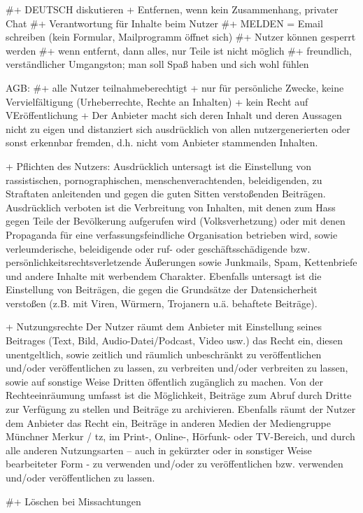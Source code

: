 #+ DEUTSCH diskutieren
+ Entfernen, wenn kein Zusammenhang, privater Chat
#+ Verantwortung für Inhalte beim Nutzer
#+ MELDEN = Email schreiben (kein Formular, Mailprogramm öffnet sich)
#+ Nutzer können gesperrt werden
#+ wenn entfernt, dann alles, nur Teile ist nicht möglich
#+ freundlich, verständlicher Umgangston; man soll Spaß haben und sich wohl fühlen


AGB:
#+ alle Nutzer teilnahmeberechtigt
+ nur für persönliche Zwecke, keine Vervielfältigung (Urheberrechte, Rechte an Inhalten)
+ kein Recht auf VEröffentlichung
+ Der Anbieter macht sich deren Inhalt und deren Aussagen nicht zu eigen und distanziert sich ausdrücklich von allen nutzergenerierten oder sonst erkennbar fremden, d.h. nicht vom Anbieter stammenden Inhalten.

+ Pflichten des Nutzers:
Ausdrücklich untersagt ist die Einstellung von rassistischen, pornographischen, menschenverachtenden, beleidigenden, zu Straftaten anleitenden und gegen die guten Sitten verstoßenden Beiträgen. Ausdrücklich verboten ist die Verbreitung von Inhalten, mit denen zum Hass gegen Teile der Bevölkerung aufgerufen wird (Volksverhetzung) oder mit denen Propaganda für eine verfassungsfeindliche Organisation betrieben wird, sowie verleumderische, beleidigende oder ruf- oder geschäftsschädigende bzw. persönlichkeitsrechtsverletzende Äußerungen sowie Junkmails, Spam, Kettenbriefe und andere Inhalte mit werbendem Charakter. Ebenfalls untersagt ist die Einstellung von Beiträgen, die gegen die Grundsätze der Datensicherheit verstoßen (z.B. mit Viren, Würmern, Trojanern u.ä. behaftete Beiträge).

+ Nutzungsrechte
Der Nutzer räumt dem Anbieter mit Einstellung seines Beitrages (Text, Bild, Audio-Datei/Podcast, Video usw.) das Recht ein, diesen unentgeltlich, sowie zeitlich und räumlich unbeschränkt zu veröffentlichen und/oder veröffentlichen zu lassen, zu verbreiten und/oder verbreiten zu lassen, sowie auf sonstige Weise Dritten öffentlich zugänglich zu machen. Von der Rechteeinräumung umfasst ist die Möglichkeit, Beiträge zum Abruf durch Dritte zur Verfügung zu stellen und Beiträge zu archivieren. Ebenfalls räumt der Nutzer dem Anbieter das Recht ein, Beiträge in anderen Medien der Mediengruppe Münchner Merkur / tz, im Print-, Online-, Hörfunk- oder TV-Bereich, und durch alle anderen Nutzungsarten – auch in gekürzter oder in sonstiger Weise bearbeiteter Form - zu verwenden und/oder zu veröffentlichen bzw. verwenden und/oder veröffentlichen zu lassen.

#+ Löschen bei Missachtungen
